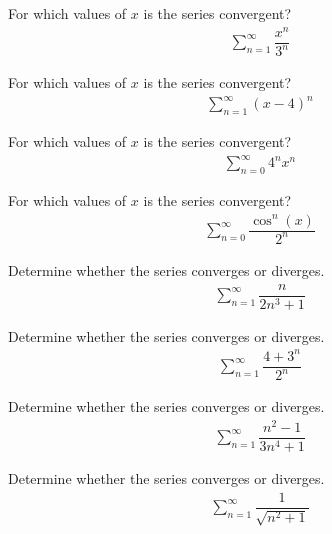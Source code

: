 \begin{exercise}
For which values of $x$ is the series convergent?
\begin{align*}
    \sum_{n=1}^{\infty}\dfrac{x^{n}}{3^{n}}
\end{align*}
\end{exercise}

\begin{exercise}
For which values of $x$ is the series convergent?
\begin{align*}
    \sum_{n=1}^{\infty}(x - 4)^{n}
\end{align*}
\end{exercise}

\begin{exercise}
For which values of $x$ is the series convergent?
\begin{align*}
    \sum_{n=0}^{\infty}4^{n}x^{n} 
\end{align*}
\end{exercise}

\begin{exercise}
For which values of $x$ is the series convergent?
\begin{align*}
    \sum_{n=0}^{\infty}\dfrac{\cos^{n}(x)}{2^{n}}
\end{align*}
\end{exercise}

\begin{exercise}
Determine whether the series converges or diverges.
\begin{align*}
    \sum_{n=1}^{\infty} \dfrac{n}{2n^{3} + 1}
\end{align*}
\end{exercise}

\begin{exercise}
Determine whether the series converges or diverges.
\begin{align*}
    \sum_{n=1}^{\infty} \dfrac{4+3^{n}}{2^{n}}
\end{align*}
\end{exercise}

\begin{exercise}
Determine whether the series converges or diverges.
\begin{align*}
    \sum_{n=1}^{\infty} \dfrac{n^{2} - 1}{3n^{4} + 1}
\end{align*}
\end{exercise}

\begin{exercise}
Determine whether the series converges or diverges.
\begin{align*}
    \sum_{n=1}^{\infty} \dfrac{1}{\sqrt{n^{2} + 1}}
\end{align*}
\end{exercise}

